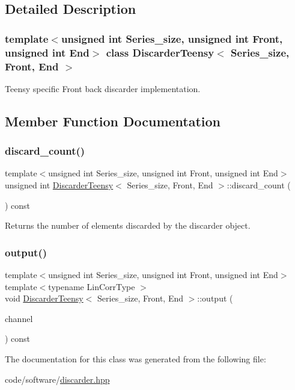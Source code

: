 \subsection{Detailed Description}
\subsubsection*{template$<$unsigned int Series\+\_\+size, unsigned int Front, unsigned int End$>$\newline
class Discarder\+Teensy$<$ Series\+\_\+size, Front, End $>$}

Teensy specific Front back discarder implementation. 

\subsection{Member Function Documentation}
\mbox{\label{classDiscarderTeensy_acddeb78ebed208384b8ce100d9c503e6}} 
\subsubsection{\texorpdfstring{discard\+\_\+count()}{discard\_count()}}
{\footnotesize\ttfamily template$<$unsigned int Series\+\_\+size, unsigned int Front, unsigned int End$>$ \\
unsigned int \hyperlink{classDiscarderTeensy}{Discarder\+Teensy}$<$ Series\+\_\+size, Front, End $>$\+::discard\+\_\+count (\begin{DoxyParamCaption}{ }\end{DoxyParamCaption}) const\hspace{0.3cm}{\ttfamily [inline]}}



Returns the number of elements discarded by the discarder object. 

\mbox{\label{classDiscarderTeensy_ae7f8709724630ac3cc82a7a3ee202f2c}} 
\subsubsection{\texorpdfstring{output()}{output()}}
{\footnotesize\ttfamily template$<$unsigned int Series\+\_\+size, unsigned int Front, unsigned int End$>$ \\
template$<$typename Lin\+Corr\+Type $>$ \\
void \hyperlink{classDiscarderTeensy}{Discarder\+Teensy}$<$ Series\+\_\+size, Front, End $>$\+::output (\begin{DoxyParamCaption}\item[{const Lin\+Corr\+Type \&}]{channel }\end{DoxyParamCaption}) const\hspace{0.3cm}{\ttfamily [inline]}}



The documentation for this class was generated from the following file\+:\begin{DoxyCompactItemize}
\item 
code/software/\hyperlink{discarder_8hpp}{discarder.\+hpp}\end{DoxyCompactItemize}
